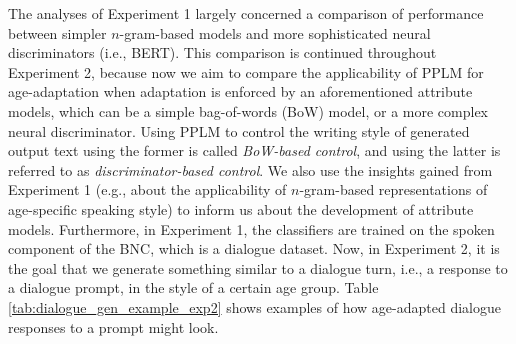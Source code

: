 The analyses of Experiment 1 largely concerned a comparison of performance between simpler $n$-gram-based models and more sophisticated neural discriminators (i.e., BERT). This comparison is continued throughout Experiment 2, because now we aim to compare the applicability of PPLM for age-adaptation when adaptation is enforced by an aforementioned attribute models, which can be a simple bag-of-words (BoW) model, or a more complex neural discriminator. Using PPLM to control the writing style of generated output text using the former is called \textit{BoW-based control}, and using the latter is referred to as \textit{discriminator-based control}. We also use the insights gained from Experiment 1 (e.g., about the applicability of $n$-gram-based representations of age-specific speaking style) to inform us about the development of attribute models. Furthermore, in Experiment 1, the classifiers are trained on the spoken component of the BNC, which is a dialogue dataset. Now, in Experiment 2, it is the goal that we generate something similar to a dialogue turn, i.e., a response to a dialogue prompt, in the style of a certain age group. Table \ref{tab:dialogue_gen_example_exp2} shows examples of how age-adapted dialogue responses to a prompt might look.

